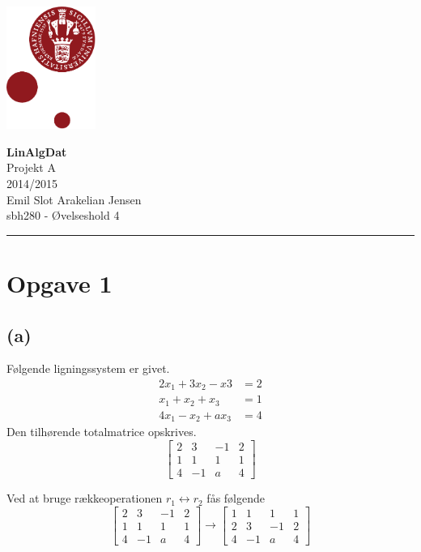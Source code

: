 \documentclass[12pt]{article}
\begin{document}
\begin{minipage}[b]{1.0\linewidth} 
\includegraphics[height=40mm]{KULogo}

\vspace*{-25ex}
\begin{center}
    {\Large \bf LinAlgDat} \vspace*{1ex} \\
    {\large Projekt A} \vspace*{1ex} \\
    {\large 2014/2015} \vspace*{1ex} \\
    {\large Emil Slot Arakelian Jensen} \vspace*{1ex}\\
    {\large sbh280 - Øvelseshold 4} 
\end{center}

\vspace*{-3pt}
{\color{KU-red}\hrule}
\end{minipage}

\newpage
\tableofcontents

\newpage
\section{Opgave 1}
\subsection{(a)}
Følgende ligningssystem er givet. 
\begin{align*}
2x_1+3x_2-x3&=2 \\
x_1+x_2+x_3&=1 \\
4x_1-x_2+ax_3&=4 
\end{align*} 
Den tilhørende totalmatrice opskrives. \\
$$
\left[\begin{array}{rrr|r}
2&3&-1&2\\
1&1&1&1\\
4&-1&a&4
\end{array}\right]
$$ 

Ved at bruge rækkeoperationen $r_1 \leftrightarrow r_2$ fås følgende\\
$$
\left[\begin{array}{rrr|r}
2&3&-1&2\\
1&1&1&1\\
4&-1&a&4
\end{array}\right] 
\to 
\left[\begin{array}{rrr|r}
1&1&1&1\\
2&3&-1&2\\
4&-1&a&4
\end{array}\right]
$$
\end{document}
